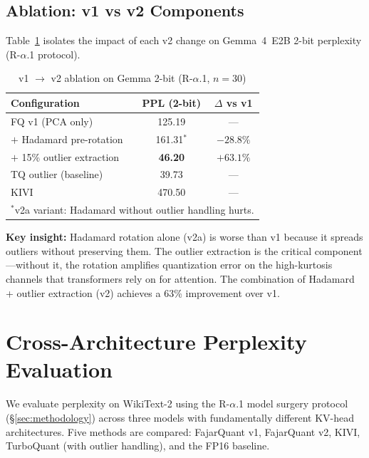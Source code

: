 \documentclass{article}
\begin{document}
\subsection{Ablation: v1 vs v2 Components}

Table~\ref{tab:v1v2_ablation} isolates the impact of each v2 change
on Gemma~4~E2B 2-bit perplexity (R-$\alpha$.1 protocol).

\begin{table}[t]
\centering
\small
\caption{v1 $\to$ v2 ablation on Gemma 2-bit (R-$\alpha$.1, $n{=}30$)}
\label{tab:v1v2_ablation}
\begin{tabular}{lcc}
\toprule
Configuration & PPL (2-bit) & $\Delta$ vs v1 \\
\midrule
FQ v1 (PCA only) & 125.19 & --- \\
$+$ Hadamard pre-rotation & 161.31$^*$ & $-28.8\%$ \\
$+$ 15\% outlier extraction & \textbf{46.20} & $+63.1\%$ \\
\midrule
TQ outlier (baseline) & 39.73 & --- \\
KIVI & 470.50 & --- \\
\bottomrule
\multicolumn{3}{l}{\footnotesize $^*$v2a variant: Hadamard without outlier handling hurts.} \\
\end{tabular}
\end{table}

\textbf{Key insight:} Hadamard rotation alone (v2a) is worse than v1
because it spreads outliers without preserving them. The outlier
extraction is the critical component---without it, the rotation
amplifies quantization error on the high-kurtosis channels that
transformers rely on for attention. The combination of Hadamard +
outlier extraction (v2) achieves a 63\% improvement over v1.

\section{Cross-Architecture Perplexity Evaluation}
\label{sec:perplexity}

We evaluate perplexity on WikiText-2 using the R-$\alpha$.1 model
surgery protocol (\S\ref{sec:methodology}) across three models with
fundamentally different KV-head architectures. Five methods are
compared: FajarQuant v1, FajarQuant v2, KIVI, TurboQuant (with
outlier handling), and the FP16 baseline.
\end{document}
